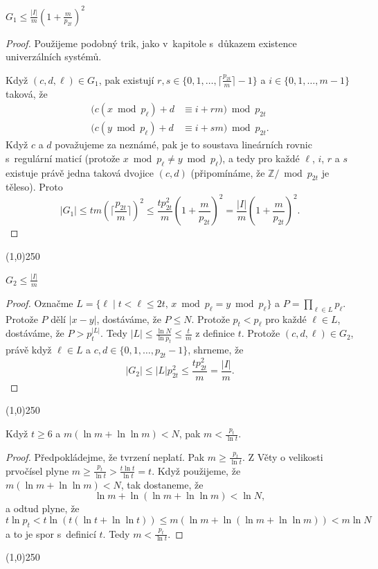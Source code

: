 \documentclass[a4paper,12pt]{article}
\newenvironment{myproof}{
  \begin{proof}
    
  }{
  \end{proof}
  \begin{center}
   \line(1,0){250}
   \end{center}
  }
\begin{document}
\begin{veta}
    $G_1\le\frac {|I|}m(1+\frac m{p_{2t}})^2$
\end{veta} 
\begin{myproof}
Použijeme podobný trik, jako v~kapitole s~důkazem existence univerzálních systémů.

    Když $(c,d,\ell )\in G_1$, pak 
existují $r,s\in \{0,1,\dots,\lceil\frac {p_{2t}}m\rceil -1\}$ a $
i\in \{0,1,\dots,m-1\}$ 
taková, že 
\begin{align*}(c(x\bmod p_{\ell})+d&\equiv i+rm)\bmod p_{2t}\\
(c(y\bmod p_{\ell})+d&\equiv i+sm)\bmod p_{2t}.\end{align*}
Když $c$ a $d$ považujeme za neznámé, pak je to  
soustava lineár\-ních rovnic s~regulární maticí (protože 
$x\bmod p_{\ell}\ne y\bmod p_{\ell}$), a tedy pro každé $\ell$, $
i$, $r$ a $s$ 
existuje právě jedna taková dvojice $(c,d)$ (připomínáme, že $\mathbb Z/\bmod p_{2t}$ je těleso). Proto 
$$|G_1|\le tm(\lceil\frac {p_{2t}}m\rceil )^2\le\frac {tp_{2t}^2}
m(1+\frac m{p_{2t}})^2=\frac {|I|}m(1+\frac m{p_{2t}})^2.$$
\end{myproof}

\begin{veta}
    $G_2\le\frac {|I|}m$
\end{veta}

\begin{myproof}
    Označme 
$L=\{\ell\mid t<\ell\le 2t,\,x\bmod p_{\ell}=y\bmod p_{\ell}\}$ a $
P=\prod_{\ell\in L}p_{\ell}$. 
Protože $P$ dělí $|x-y|$, dostáváme, že $P\le N$. Protože 
$p_t<p_{\ell}$ pro každé $\ell\in L$, dostáváme, že $
P>p_t^{|L|}$. Tedy 
$|L|\le\frac {\ln N}{\ln p_t}\le\frac tm$ z definice $t$. Protože $
(c,d,\ell )\in G_2$, právě 
když $\ell\in L$ a $c,d\in \{0,1,\dots,p_{2t}-1\}$, shrneme, že 
$$|G_2|\le |L|p_{2t}^2\le\frac {tp_{2t}^2}m=\frac {|I|}m.$$
\end{myproof}

\begin{lemma}Když $t\ge 6$ a $m(\ln m+\ln\ln m)<N$, pak $m<\frac {
p_t}{\ln t}$.
\end{lemma}

\begin{myproof}Předpokládejme, že tvrzení neplatí. Pak $
m\ge\frac {p_t}{\ln t}$. Z Věty o velikosti 
prvo\-čí\-sel plyne $m\ge\frac {p_t}{\ln t}>\frac {t\ln 
t}{\ln t}=t$. Když použijeme, že 
$m(\ln m+\ln\ln m)<N$, tak dostaneme, že 
$$\ln m+\ln(\ln m+\ln\ln m)<\ln N,$$
a odtud plyne, že 
$$t\ln p_t<t\ln(t(\ln t+\ln\ln t))\le m(\ln m+\ln(\ln m+\ln\ln m)
)<m\ln N$$
a to je spor s~definicí $t$. Tedy $m<\frac {p_t}{\ln t}$.
\end{myproof}
\end{document}

